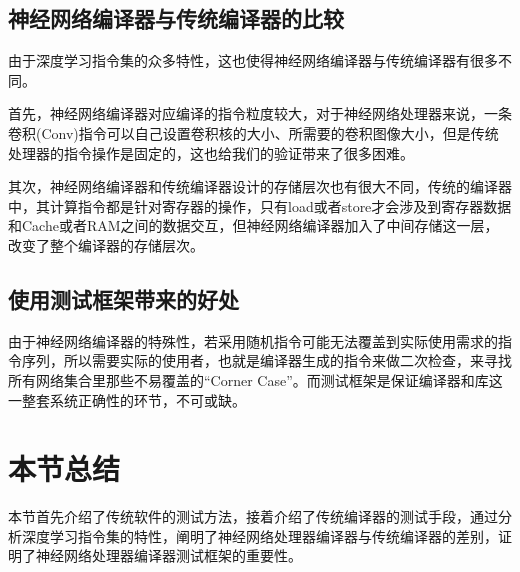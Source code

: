 \subsection{神经网络编译器与传统编译器的比较}
由于深度学习指令集的众多特性，这也使得神经网络编译器与传统编译器有很多不同。

首先，神经网络编译器对应编译的指令粒度较大，对于神经网络处理器来说，一条卷积(Conv)指令可以自己设置卷积核的大小、所需要的卷积图像大小，但是传统处理器的指令操作是固定的，这也给我们的验证带来了很多困难。

其次，神经网络编译器和传统编译器设计的存储层次也有很大不同，传统的编译器中，其计算指令都是针对寄存器的操作，只有load或者store才会涉及到寄存器数据和Cache或者RAM之间的数据交互，但神经网络编译器加入了中间存储这一层，改变了整个编译器的存储层次。

\subsection{使用测试框架带来的好处}
由于神经网络编译器的特殊性，若采用随机指令可能无法覆盖到实际使用需求的指令序列，所以需要实际的使用者，也就是编译器生成的指令来做二次检查，来寻找所有网络集合里那些不易覆盖的“Corner Case”。而测试框架是保证编译器和库这一整套系统正确性的环节，不可或缺。

\section{本节总结}
本节首先介绍了传统软件的测试方法，接着介绍了传统编译器的测试手段，通过分析深度学习指令集的特性，阐明了神经网络处理器编译器与传统编译器的差别，证明了神经网络处理器编译器测试框架的重要性。